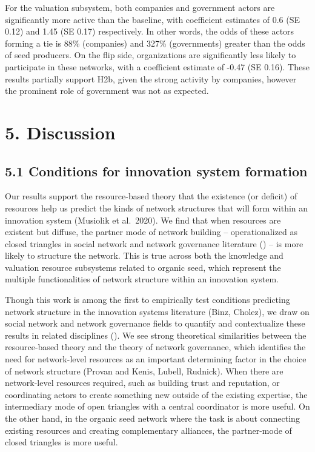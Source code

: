 \documentclass[twoside,12pt,final]{ucthesis-CA2012}
\begin{document}
\begin{ucmainmatter}
For the valuation subsystem, both companies and government actors are
significantly more active than the baseline, with coefficient estimates
of 0.6 (SE 0.12) and 1.45 (SE 0.17) respectively. In other words, the
odds of these actors forming a tie is 88\% (companies) and 327\%
(governments) greater than the odds of seed producers. On the flip side,
organizations are significantly less likely to participate in these
networks, with a coefficient estimate of -0.47 (SE 0.16). These results
partially support H2b, given the strong activity by companies, however
the prominent role of government was not as expected.

\hypertarget{discussion-1}{%
\section{5. Discussion}\label{discussion-1}}

\hypertarget{conditions-for-innovation-system-formation}{%
\subsection{5.1 Conditions for innovation system formation}\label{conditions-for-innovation-system-formation}}

Our results support the resource-based theory that the existence (or
deficit) of resources help us predict the kinds of network structures
that will form within an innovation system (Musiolik et al.~2020). We
find that when resources are existent but diffuse, the partner mode of
network building -- operationalized as closed triangles in social
network and network governance literature () -- is more likely to
structure the network. This is true across both the knowledge and
valuation resource subsystems related to organic seed, which represent
the multiple functionalities of network structure within an innovation
system.

Though this work is among the first to empirically test conditions
predicting network structure in the innovation systems literature (Binz,
Cholez), we draw on social network and network governance fields to
quantify and contextualize these results in related disciplines (). We
see strong theoretical similarities between the resource-based theory
and the theory of network governance, which identifies the need for
network-level resources as an important determining factor in the choice
of network structure (Provan and Kenis, Lubell, Rudnick). When there are
network-level resources required, such as building trust and reputation,
or coordinating actors to create something new outside of the existing
expertise, the intermediary mode of open triangles with a central
coordinator is more useful. On the other hand, in the organic seed
network where the task is about connecting existing resources and
creating complementary alliances, the partner-mode of closed triangles
is more useful.


\end{ucmainmatter}
\end{document}
